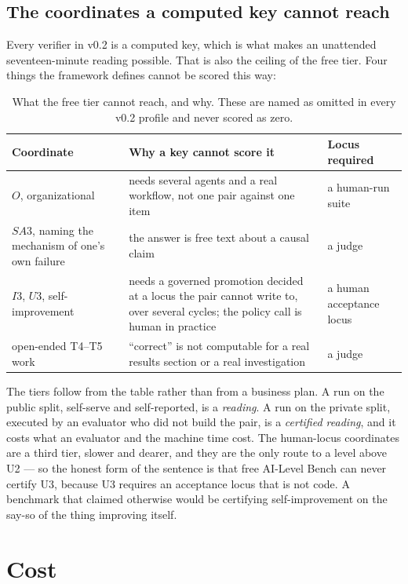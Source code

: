 \documentclass[11pt]{article}
\theoremstyle{definition}
\begin{document}
\subsection{The coordinates a computed key cannot reach}

Every verifier in v0.2 is a computed key, which is what makes an unattended seventeen-minute reading possible. That is also the ceiling of the free tier. Four things the framework defines cannot be scored this way:

\begin{table}[!htbp]
\centering\small
\begin{tabularx}{\textwidth}{@{}>{\raggedright\arraybackslash}p{3.2cm}Y>{\raggedright\arraybackslash}p{2.4cm}@{}}
\toprule
Coordinate & Why a key cannot score it & Locus required \\
\midrule
$O$, organizational & needs several agents and a real workflow, not one pair against one item & a human-run suite \\
$SA3$, naming the mechanism of one's own failure & the answer is free text about a causal claim & a judge \\
$I3$, $U3$, self-improvement & needs a governed promotion decided at a locus the pair cannot write to, over several cycles; the policy call is human in practice & a human acceptance locus \\
open-ended T4--T5 work & ``correct'' is not computable for a real results section or a real investigation & a judge \\
\bottomrule
\end{tabularx}
\caption{What the free tier cannot reach, and why. These are named as omitted in every v0.2 profile and never scored as zero.}
\label{tab:human}
\end{table}

The tiers follow from the table rather than from a business plan. A run on the public split, self-serve and self-reported, is a \emph{reading}. A run on the private split, executed by an evaluator who did not build the pair, is a \emph{certified reading}, and it costs what an evaluator and the machine time cost. The human-locus coordinates are a third tier, slower and dearer, and they are the only route to a level above U2 --- so the honest form of the sentence is that free AI-Level Bench can never certify U3, because U3 requires an acceptance locus that is not code. A benchmark that claimed otherwise would be certifying self-improvement on the say-so of the thing improving itself.

\section{Cost}\label{sec:cost}
\end{document}
